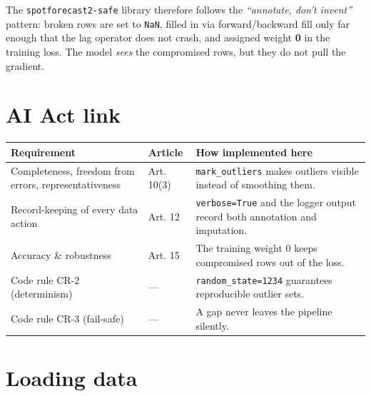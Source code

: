 \documentclass[
  english,
  letterpaper,
]{scrbook}
\newcounter{none} %
\begin{document}
The \texttt{spotforecast2-safe} library therefore follows the
\emph{``annotate, don't invent''} pattern: broken rows are set to
\texttt{NaN}, filled in via forward/backward fill only far enough that
the lag operator does not crash, and assigned weight \textbf{0} in the
training loss. The model \emph{sees} the compromised rows, but they do
not pull the gradient.

\section{AI Act link}\label{ai-act-link-1}

{\def\LTcaptype{none} %
\begin{longtable}[]{@{}
  >{\raggedright\arraybackslash}p{}
  >{\raggedright\arraybackslash}p{}
  >{\raggedright\arraybackslash}p{}@{}}
\toprule\noalign{}
\begin{minipage}[b]{\linewidth}\raggedright
Requirement
\end{minipage} & \begin{minipage}[b]{\linewidth}\raggedright
Article
\end{minipage} & \begin{minipage}[b]{\linewidth}\raggedright
How implemented here
\end{minipage} \\
\midrule\noalign{}
\endhead
\bottomrule\noalign{}
\endlastfoot
Completeness, freedom from errors, representativeness & Art. 10(3) &
\texttt{mark\_outliers} makes outliers visible instead of smoothing
them. \\
Record-keeping of every data action & Art. 12 & \texttt{verbose=True}
and the logger output record both annotation and imputation. \\
Accuracy \& robustness & Art. 15 & The training weight 0 keeps
compromised rows out of the loss. \\
Code rule CR-2 (determinism) & --- & \texttt{random\_state=1234}
guarantees reproducible outlier sets. \\
Code rule CR-3 (fail-safe) & --- & A gap never leaves the pipeline
silently. \\
\end{longtable}
}

\section{Loading data}\label{loading-data}
\end{document}
